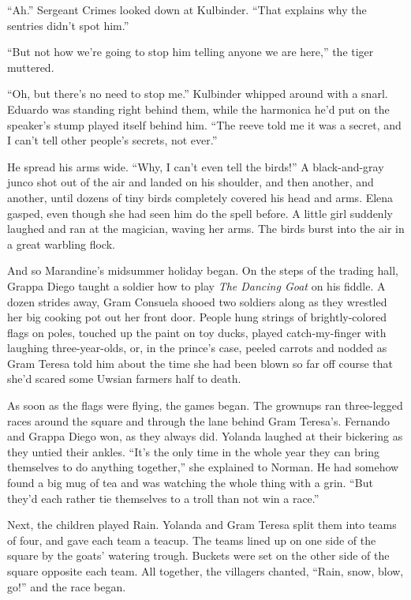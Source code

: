 \documentclass[10pt]{book}
\begin{document}
``Ah.''  Sergeant Crimes looked down at Kulbinder.  ``That explains why the sentries didn't spot him.''

``But not how we're going to stop him telling anyone we are here,'' the tiger muttered.

``Oh, but there's no need to stop me.'' Kulbinder whipped around with a snarl. Eduardo was standing right behind them, while the harmonica he'd put on the speaker's stump played itself behind him.  ``The reeve told me it was a secret, and I can't tell other people's secrets, not ever.''

He spread his arms wide. ``Why, I can't even tell the birds!'' A black-and-gray junco shot out of the air and landed on his shoulder, and then another, and another, until dozens of tiny birds completely covered his head and arms. Elena gasped, even though she had seen him do the spell before. A little girl suddenly laughed and ran at the magician, waving her arms. The birds burst into the air in a great warbling flock.

And so Marandine's midsummer holiday began.  On the steps of the trading hall, Grappa Diego taught a soldier how to play \emph{The Dancing Goat} on his fiddle.  A dozen strides away, Gram Consuela shooed two soldiers along as they wrestled her big cooking pot out her front door.  People hung strings of brightly-colored flags on poles, touched up the paint on toy ducks, played catch-my-finger with laughing three-year-olds, or, in the prince's case, peeled carrots and nodded as Gram Teresa told him about the time she had been blown so far off course that she'd scared some Uwsian farmers half to death.

As soon as the flags were flying, the games began.  The grownups ran three-legged races around the square and through the lane behind Gram Teresa's. Fernando and Grappa Diego won, as they always did. Yolanda laughed at their bickering as they untied their ankles. ``It's the only time in the whole year they can bring themselves to do anything together,'' she explained to Norman. He had somehow found a big mug of tea and was watching the whole thing with a grin. ``But they'd each rather tie themselves to a troll than not win a race.''

Next, the children played Rain. Yolanda and Gram Teresa split them into teams of four, and gave each team a teacup. The teams lined up on one side of the square by the goats' watering trough. Buckets were set on the other side of the square opposite each team. All together, the villagers chanted, ``Rain, snow, blow, go!'' and the race began.
\end{document}
